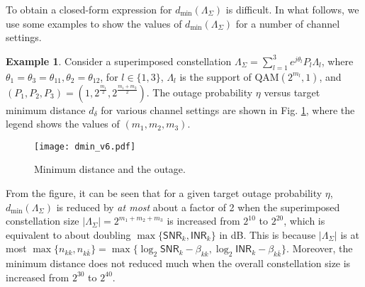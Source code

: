 \documentclass[12pt, draftclsnofoot, onecolumn]{IEEEtran}
\newcommand{\msf}[1]{\mathsf{#1}}
\newcommand{\SNR}{\msf{SNR}}
\newcommand{\INR}{\msf{INR}}
\theoremstyle{definition}
\newtheorem{example}{Example}
\begin{document}


To obtain a closed-form expression for $d_{\min}(\Lambda_{\Sigma})$ is difficult. In what follows, we use some examples to show the values of $d_{\min}(\Lambda_{\Sigma})$ for a number of channel settings.


\begin{example}
Consider a superimposed constellation $\Lambda_{\Sigma} = \sum_{l=1}^3e^{j\theta_l}P_l\Lambda_l$, where $\theta_1 = \theta_3 = \theta_{11},\theta_2 = \theta_{12}$, for $l\in\{1,3\}$, $\Lambda_l$ is the support of $\text{QAM}(2^{m_l},1)$, and $(P_1,P_2,P_3) = (1,2^{\frac{m_1}{2}},2^{\frac{m_1+m_2}{2}})$. The outage probability $\eta$ versus target minimum distance $d_{\delta}$ for various channel settings are shown in Fig. \ref{fig:dmin_1}, where the legend shows the values of $(m_1,m_2,m_3)$.

\begin{figure}[t!]
	\centering
\texttt{[image: dmin\_v6.pdf]}
\caption{Minimum distance and the outage.}
\label{fig:dmin_1}
\end{figure}

From the figure, it can be seen that for a given target outage probability $\eta$, $d_{\min}(\Lambda_{\Sigma})$ is reduced by \emph{at most} about a factor of 2 when the superimposed constellation size $|\Lambda_{\Sigma}| = 2^{m_1+m_2+m_3}$ is increased from $2^{10}$ to $2^{20}$, which is equivalent to about doubling $\max\{\SNR_k,\INR_k\}$ in dB. This is because $|\Lambda_{\Sigma}|$ is at most $\max\{n_{kk},n_{k\bar{k}}\} = \max\{\log_2\SNR_k - \beta_{kk},\log_2\INR_k - \beta_{k\bar{k}}\}$. Moreover, the minimum distance does not reduced much when the overall constellation size is increased from $2^{30}$ to $2^{40}$.
%
%
\end{example}
\end{document}
